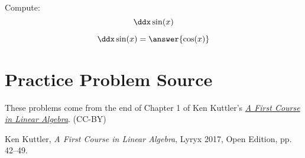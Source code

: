 \documentclass{ximera}
\begin{document}
\begin{problem}  
Compute:  
\[  
\ddx \sin(x)  
\]  
\begin{prompt}  
\[  
\ddx \sin(x) = \answer{\cos(x)}  
\]  
\end{prompt}  
\end{problem}


\section*{Practice Problem Source}
These problems come from the end of Chapter 1 of Ken Kuttler's \href{https://open.umn.edu/opentextbooks/textbooks/a-first-course-in-linear-algebra-2017}{\it A First Course in Linear Algebra}. (CC-BY)

Ken Kuttler, {\it  A First Course in Linear Algebra}, Lyryx 2017, Open Edition, pp. 42--49. 
\end{document}
